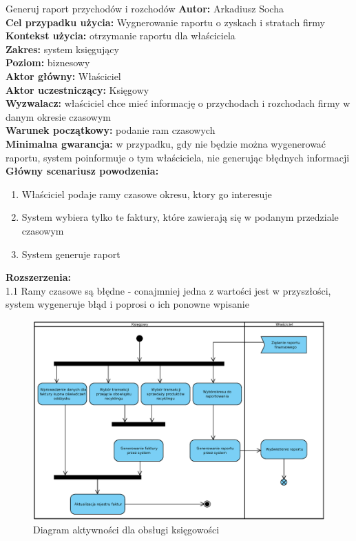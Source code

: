 	\begin{usecase}{Generuj raport przychodów i rozchodów}
		\textbf{Autor:} Arkadiusz Socha\\
		\textbf{Cel przypadku użycia:} Wygnerowanie raportu o zyskach i stratach firmy \\
		\textbf{Kontekst użycia:} otrzymanie raportu dla właściciela  \\
		\textbf{Zakres:} system księgujący \\
		\textbf{Poziom:} biznesowy \\
		\textbf{Aktor główny:} Właściciel \\
		\textbf{Aktor uczestniczący:} Księgowy \\
		\textbf{Wyzwalacz:} właściciel chce mieć informację o przychodach i rozchodach firmy w danym okresie czasowym \\
		\textbf{Warunek początkowy:} podanie ram czasowych  \\
		\textbf{Minimalna gwarancja:} w przypadku, gdy nie będzie można wygenerować raportu, system poinformuje o tym właściciela, nie generując błędnych informacji \\
		\textbf{Główny scenariusz powodzenia:} 
			\begin{enumerate}
				\item Właściciel podaje ramy czasowe okresu, ktory go interesuje
				\item System wybiera tylko te faktury, które zawierają się w podanym przedziale czasowym
				\item System generuje raport
			\end{enumerate}
		\textbf{Rozszerzenia:} \\
		1.1 Ramy czasowe są błędne - conajmniej jedna z wartości jest w przyszłości, system wygeneruje błąd i poprosi o ich ponowne wpisanie
	\end{usecase}

	\begin{figure}[H]
		\centering
		\centerline{\includegraphics[width=1.2\textwidth]{img/AD/ksiegowosc.eps}}
		\caption{Diagram aktywności dla obsługi księgowości}
	\end{figure}

